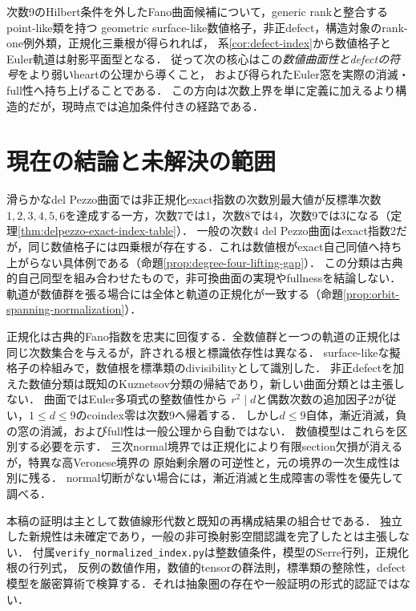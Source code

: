 \documentclass[11pt,a4paper]{ltjsarticle}
\begin{document}
\begin{remark}[次数9を所与としない認識への接続]\label{rem:degree-free-route}
次数9のHilbert条件を外したFano曲面候補について，generic rankと整合するpoint-like類を持つ
geometric surface-like数値格子，非正defect，構造対象のrank-one例外類，正規化三乗根が得られれば，
系\ref{cor:defect-index}から数値格子とEuler軌道は射影平面型となる．
従って次の核心はこの\emph{数値曲面性とdefectの符号}をより弱いheartの公理から導くこと，
および得られたEuler窓を実際の消滅・full性へ持ち上げることである．
この方向は次数上界を単に定義に加えるより構造的だが，現時点では追加条件付きの経路である．
\end{remark}

\section{現在の結論と未解決の範囲}
滑らかなdel Pezzo曲面では非正規化exact指数の次数別最大値が反標準次数$1,2,3,4,5,6$を達成する一方，次数7では1，次数8では4，次数9では3になる（定理\ref{thm:delpezzo-exact-index-table}）．
一般の次数4 del Pezzo曲面はexact指数2だが，同じ数値格子には四乗根が存在する．これは数値根がexact自己同値へ持ち上がらない具体例である（命題\ref{prop:degree-four-lifting-gap}）．
この分類は古典的自己同型を組み合わせたもので，非可換曲面の実現やfullnessを結論しない．
軌道が数値群を張る場合には全体と軌道の正規化が一致する（命題\ref{prop:orbit-spanning-normalization}）．

正規化は古典的Fano指数を忠実に回復する．全数値群と一つの軌道の正規化は同じ次数集合を与えるが，許される根と標識依存性は異なる．
surface-likeな擬格子の枠組みで，数値根を標準類のdivisibilityとして識別した．
非正defectを加えた数値分類は既知のKuznetsov分類の帰結であり，新しい曲面分類とは主張しない．
曲面ではEuler多項式の整数値性から
$r^2\mid d$と偶数次数の追加因子2が従い，$1\le d\le9$のcoindex零は次数9へ帰着する．
しかし$d\le9$自体，漸近消滅，負の窓の消滅，およびfull性は一般公理から自動ではない．
数値模型はこれらを区別する必要を示す．
三次normal境界では正規化により有限section欠損が消えるが，特異な高Veronese境界の
原始剰余層の可逆性と，元の境界の一次生成性は別に残る．
normal切断がない場合には，漸近消滅と生成障害の零性を優先して調べる．

本稿の証明は主として数値線形代数と既知の再構成結果の組合せである．
独立した新規性は未確定であり，一般の非可換射影空間認識を完了したとは主張しない．
付属\texttt{verify\_normalized\_index.py}は整数値条件，模型のSerre行列，正規化根の行列式，
反例の数値作用，数値的tensorの群法則，標準類の整除性，defect模型を厳密算術で検算する．それは抽象圏の存在や一般証明の形式的認証ではない．
\end{document}
